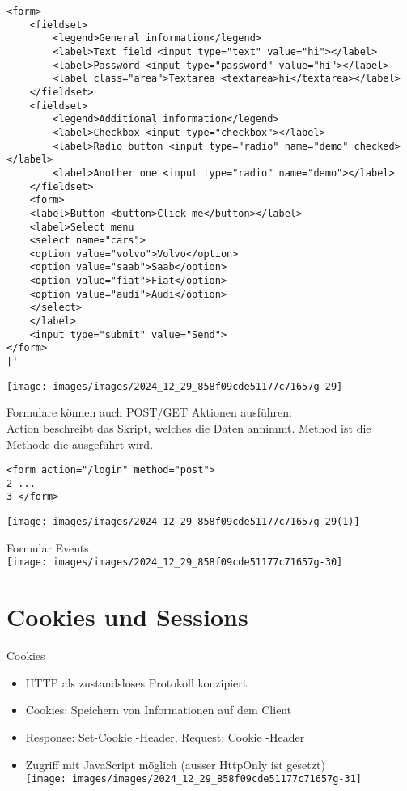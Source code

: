 \begin{verbatim}
<form>
    <fieldset>
        <legend>General information</legend>
        <label>Text field <input type="text" value="hi"></label>
        <label>Password <input type="password" value="hi"></label>
        <label class="area">Textarea <textarea>hi</textarea></label>
    </fieldset>
    <fieldset>
        <legend>Additional information</legend>
        <label>Checkbox <input type="checkbox"></label>
        <label>Radio button <input type="radio" name="demo" checked></label>
        <label>Another one <input type="radio" name="demo"></label>
    </fieldset>
    <form>
    <label>Button <button>Click me</button></label>
    <label>Select menu
    <select name="cars">
    <option value="volvo">Volvo</option>
    <option value="saab">Saab</option>
    <option value="fiat">Fiat</option>
    <option value="audi">Audi</option>
    </select>
    </label>
    <input type="submit" value="Send">
</form>
|'
\end{verbatim}

\begin{center}
\texttt{[image: images/images/2024\_12\_29\_858f09cde51177c71657g-29]}
\end{center}

Formulare können auch POST/GET Aktionen ausführen:\\
Action beschreibt das Skript, welches die Daten annimmt. Method ist die Methode die ausgeführt wird.

\begin{verbatim}
<form action="/login" method="post">
2 ...
3 </form>
\end{verbatim}

\begin{center}
\texttt{[image: images/images/2024\_12\_29\_858f09cde51177c71657g-29(1)]}
\end{center}

Formular Events\\
\texttt{[image: images/images/2024\_12\_29\_858f09cde51177c71657g-30]}

\section*{Cookies und Sessions}
Cookies

\begin{itemize}
  \item HTTP als zustandsloses Protokoll konzipiert
  \item Cookies: Speichern von Informationen auf dem Client
  \item Response: Set-Cookie -Header, Request: Cookie -Header
  \item Zugriff mit JavaScript möglich (ausser HttpOnly ist gesetzt)\\
\texttt{[image: images/images/2024\_12\_29\_858f09cde51177c71657g-31]}
\end{itemize}

